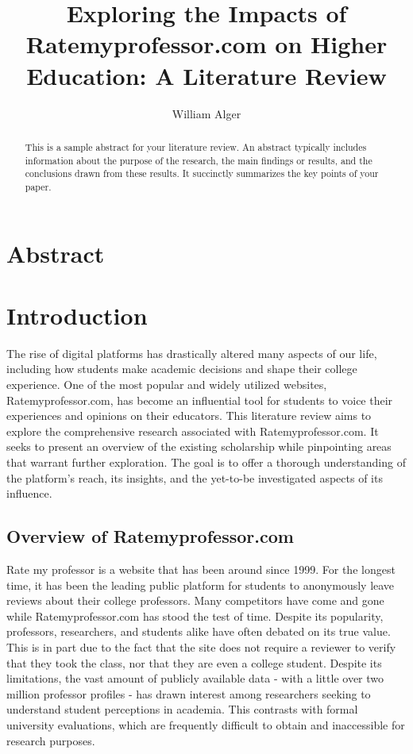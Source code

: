 \documentclass[doc,12pt, twocolumn]{apa7}
\title{Exploring the Impacts of Ratemyprofessor.com on Higher Education: A Literature Review}
\author{William Alger}
\affiliation{Northern Kentucky University}
\begin{document}
\maketitle

\section*{Abstract}
\begin{abstract}
    This is a sample abstract for your literature review. An abstract typically includes information about the purpose of the research, the main findings or results, and the conclusions drawn from these results. It succinctly summarizes the key points of your paper.
\end{abstract}

\section{Introduction}
The rise of digital platforms has drastically altered many aspects of our life, including how students make academic decisions and shape their college experience. One of the most popular and widely utilized websites, Ratemyprofessor.com, has become an influential tool for students to voice their experiences and opinions on their educators. This literature review aims to explore the comprehensive research associated with Ratemyprofessor.com. It seeks to present an overview of the existing scholarship while pinpointing areas that warrant further exploration. The goal is to offer a thorough understanding of the platform's reach, its insights, and the yet-to-be investigated aspects of its influence.

\subsection{Overview of Ratemyprofessor.com}
Rate my professor is a website that has been around since 1999. For the longest time, it has been the leading public platform for students to anonymously leave reviews about their college professors. Many competitors have come and gone while Ratemyprofessor.com has stood the test of time. Despite its popularity, professors, researchers, and students alike have often debated on its true value. This is in part due to the fact that the site does not require a reviewer to verify that they took the class, nor that they are even a college student. Despite its limitations, the vast amount of publicly available data - with a little over two million professor profiles - has drawn interest among researchers seeking to understand student perceptions in academia. This contrasts with formal university evaluations, which are frequently difficult to obtain and inaccessible for research purposes.
\end{document}
